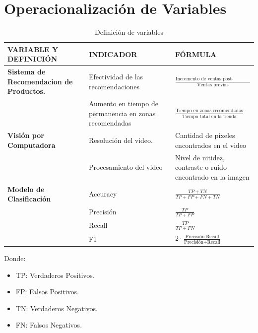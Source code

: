 \section{Operacionalización de Variables}

\begin{table}[H]
\centering
\begin{tabular}{|>{\raggedright}p{3.5cm}|p{5cm}|p{5.5cm}|}
\hline
\textbf{VARIABLE Y DEFINICIÓN} & \textbf{INDICADOR} & \textbf{FÓRMULA} \\ \hline

\textbf{Sistema de Recomendacion de Productos.}
& Efectividad de las recomendaciones & $\frac{\text{Incremento de ventas post-recomendación}}{\text{Ventas previas}}$  \\ \cline{2-3}&Aumento en tiempo de permanencia en zonas recomendadas & 
$\frac{\text{Tiempo en zonas recomendadas}}{\text{Tiempo total en la tienda}}$ \\ \hline

\textbf{Visión por Computadora} & Resolución del video. & Cantidad de pixeles encontrados en el video \\ \cline{2-3} & Procesamiento del video & Nivel de nitidez, contraste o ruido encontrado en la imagen\\ \hline
 
\textbf{Modelo de Clasificación} & Accuracy & $\frac{TP + TN}{TP + FP + FN + TN}$ \\ \cline{2-3} 
& Precisión & $\frac{TP}{TP + FP}$ \\ \cline{2-3} 
& Recall & $\frac{TP}{TP + FN}$ \\ \cline{2-3} 
& F1 & $2 \cdot \frac{\text{Precisión} \cdot \text{Recall}}{\text{Precisión} + \text{Recall}}$ \\ \hline
\end{tabular}
\caption{Definición de variables}
\label{tab:definicion_variables}
\end{table}

Donde:
\begin{itemize}
    \item TP: Verdaderos Positivos.
    \item FP: Falsos Positivos.
    \item TN: Verdaderos Negativos.
    \item FN: Falsos Negativos.
\end{itemize}


